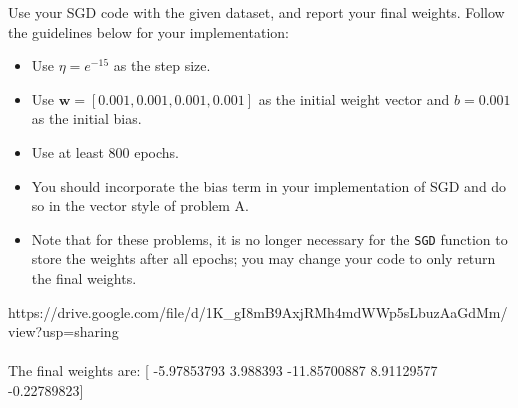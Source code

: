 \begin{problem}[6]
  Use your SGD code with the given dataset, and report your final weights. Follow the guidelines below for your implementation:

  \begin{itemize}
    \item Use $\eta = e^{-15}$ as the step size.  
    \item Use $\mathbf{w} = [0.001, 0.001, 0.001, 0.001]$ as the initial weight vector and $b = 0.001$ as the initial bias.
    \item Use at least 800 epochs.
    \item You should incorporate the bias term in your implementation of SGD and do so in the vector style of problem A.
    \item Note that for these problems, it is no longer necessary for the \texttt{SGD} function to store the weights after all epochs; you may change your code to only return the final weights.
  \end{itemize}
\end{problem}
\begin{solution}
https://drive.google.com/file/d/1K_gI8mB9AxjRMh4mdWWp5sLbuzAaGdMm/view?usp=sharing
\\
\\
The final weights are:
[ -5.97853793   3.988393   -11.85700887   8.91129577  -0.22789823]
\end{solution}

